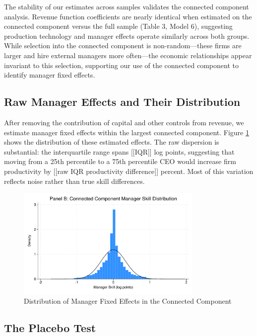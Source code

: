 \documentclass[11pt,a4paper]{article}
\begin{document}


The stability of our estimates across samples validates the connected component analysis. Revenue function coefficients are nearly identical when estimated on the connected component versus the full sample (Table 3, Model 6), suggesting production technology and manager effects operate similarly across both groups. While selection into the connected component is non-random—these firms are larger and hire external managers more often—the economic relationships appear invariant to this selection, supporting our use of the connected component to identify manager fixed effects.

\subsection{Raw Manager Effects and Their Distribution}

After removing the contribution of capital and other controls from revenue, we estimate manager fixed effects within the largest connected component. Figure \ref{fig:manager_distribution} shows the distribution of these estimated effects. The raw dispersion is substantial: the interquartile range spans [[IQR]] log points, suggesting that moving from a 25th percentile to a 75th percentile CEO would increase firm productivity by [[raw IQR productivity difference]] percent. Most of this variation reflects noise rather than true skill differences.

\begin{figure}[htbp]
\centering
\includegraphics[width=0.8\textwidth]{figure/manager_skill_connected.pdf}
\caption{Distribution of Manager Fixed Effects in the Connected Component}
\label{fig:manager_distribution}
\end{figure}

\subsection{The Placebo Test}
\end{document}

